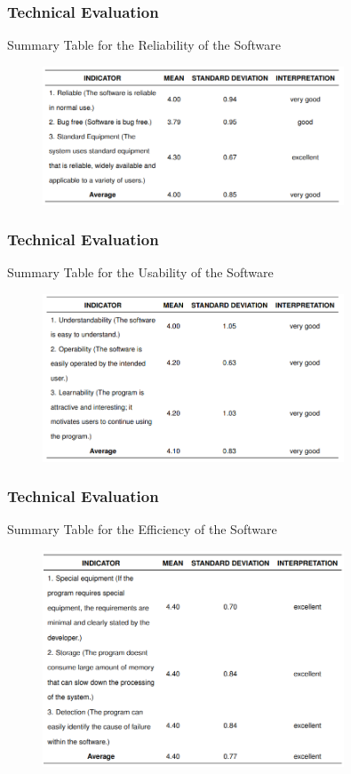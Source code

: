 \documentclass[handout]{beamer}
\begin{document}
\begin{frame}
	\frametitle{Technical Evaluation}
	\begin{block}{Summary Table for the Reliability of the Software}
		\begin{figure}
			\includegraphics[width=0.8\textwidth]{figures/res_tech_reliability.png}
		\end{figure}
	\end{block}
\end{frame}

\begin{frame}
	\frametitle{Technical Evaluation}
	\begin{block}{Summary Table for the Usability of the Software}
		\begin{figure}
			\includegraphics[width=0.8\textwidth]{figures/res_tech_usability.png}
		\end{figure}
	\end{block}
\end{frame}

\begin{frame}
	\frametitle{Technical Evaluation}
	\begin{block}{Summary Table for the Efficiency of the Software}
		\begin{figure}
			\includegraphics[width=0.8\textwidth]{figures/res_tech_efficiency.png}
		\end{figure}
	\end{block}
\end{frame}
\end{document}
